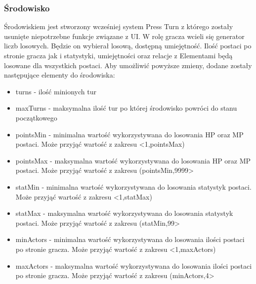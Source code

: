 \documentclass{SGGW-thesis}
\begin{document}
\subsubsection{Środowisko}
Środowiskiem jest stworzony wcześniej system Press Turn z którego zostały usunięte niepotrzebne funkcje związane z UI. W rolę gracza wcieli się generator liczb losowych. Będzie on wybierał losową, dostępną umiejętność.
Ilość postaci po stronie gracza jak i statystyki, umiejętności oraz relacje z Elementami będą losowane dla wszystkich postaci. Aby umożliwić powyższe zmieny, dodane zostały następujące elementy do środowiska:
\begin{itemize}
  \item{turns - ilość minionych tur}
  \item{maxTurns - maksymalna ilość tur po której środowisko powróci do stanu początkowego}
  \item{pointsMin - minimalna wartość wykorzystywana do losowania HP oraz MP postaci. Może przyjąć wartość z zakresu <1,pointsMax)}
  \item{pointsMax - maksymalna wartość wykorzystywana do losowania HP oraz MP postaci. Może przyjąć wartość z zakresu (pointsMin,9999>}
  \item{statMin - minimalna wartość wykorzystywana do losowania statystyk postaci. Może przyjąć wartość z zakresu <1,statMax)}
  \item{statMax - maksymalna wartość wykorzystywana do losowania statystyk postaci. Może przyjąć wartość z zakresu (statMin,99>}
  \item{minActors - minimalna wartość wykorzystywana do losowania ilości postaci po stronie gracza. Może przyjąć wartość z zakresu <1,maxActors)}
  \item{maxActors - maksymalna wartość wykorzystywana do losowania ilości postaci po stronie gracza. Może przyjąć wartość z zakresu (minActors,4>}
\end{itemize}
\end{document}
